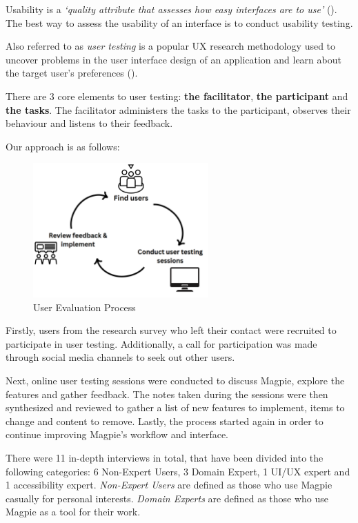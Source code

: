 Usability is a \emph{`quality attribute that assesses how easy interfaces are to
    use'} (\cite{usabilitycomponentsnielsen}). The best way to assess the usability
of an interface is to conduct usability testing.

Also referred to as \emph{user testing} is a popular UX research methodology
used to uncover problems in the user interface design of an application and
learn about the target user's preferences (\cite{usertestingdefinition}).

\noindent There are 3 core elements to user testing: \textbf{the facilitator},
\textbf{the participant} and \textbf{the tasks}. The facilitator administers the
tasks to the participant, observes their behaviour and listens to their
feedback.

\noindent Our approach is as follows:
\begin{figure}[h!]
    \centering
    \includegraphics[width=0.6\textwidth]{images/user-eval-process.png}
    \caption{User Evaluation Process}
\end{figure}

Firstly, users from the research survey who left their contact were recruited to
participate in user testing. Additionally, a call for participation was made
through social media channels to seek out other users.

Next, online user testing sessions were conducted to discuss Magpie, explore the
features and gather feedback. The notes taken during the sessions were then
synthesized and reviewed to gather a list of new features to implement, items to
change and content to remove. Lastly, the process started again in order to continue
improving Magpie's workflow and interface.

There were 11 in-depth interviews in total, that have been divided into the
following categories: 6 Non-Expert Users, 3 Domain Expert, 1 UI/UX expert and 1
accessibility expert.
\emph{Non-Expert Users} are defined as those who use Magpie casually for personal
interests.
\emph{Domain Experts} are defined as those who use Magpie as a tool
for their work.

